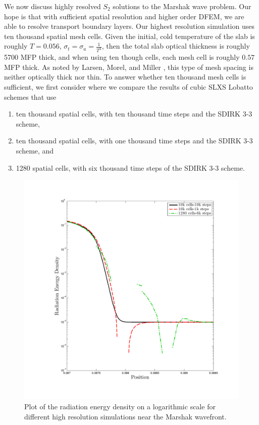 We now discuss highly resolved $S_2$ solutions to the Marshak wave problem.
Our hope is that with sufficient spatial resolution and higher order DFEM, we are able to resolve transport boundary layers.
Our highest resolution simulation uses ten thousand spatial mesh cells.
Given the initial, cold temperature of the slab is roughly $T=0.056$,  $\sigma_t = \sigma_a = \frac{1}{T^3}$, then the total slab optical thickness is roughly 5700 MFP thick, and when using ten though cells, each mesh cell is roughly $0.57$ MFP thick.  
As noted by Larsen, Morel, and Miller \cite{thick_diffusion_larsen}, this type of mesh spacing is neither optically thick nor thin.
To answer whether ten thousand mesh cells is sufficient, we first consider  where we compare the results of cubic SLXS Lobatto schemes that use
\begin{enumerate}
\item ten thousand spatial cells, with ten thousand time steps and the SDIRK 3-3 scheme,
\item ten thousand spatial cells, with one thousand time steps and the SDIRK 3-3 scheme, and 
\item 1280 spatial cells, with six thousand time steps of the SDIRK 3-3 scheme.
\end{enumerate} 
\begin{figure}[!htp]
\centering
\includegraphics[width=13cm,trim=1.0in  0.75in 1.0in 1.0in,clip=true]{chapter6_grey_radtran/Dissertation_Data/Zoom_10k_Phi.pdf}
\caption{Plot of the radiation energy density on a logarithmic scale for different high resolution simulations near the Marshak wavefront.}
\label{fig:res_zoom_comparison}
\end{figure}
